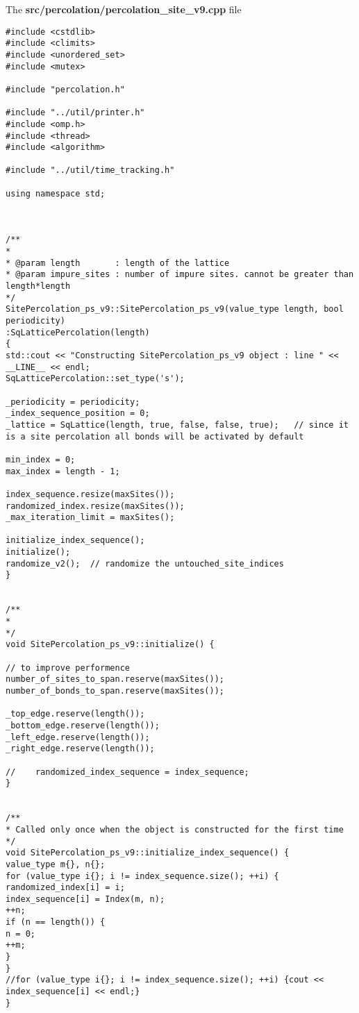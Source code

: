 
The \textbf{src/percolation/percolation\_site\_v9.cpp} file

\begin{lstlisting}[style=CStyle]
#include <cstdlib>
#include <climits>
#include <unordered_set>
#include <mutex>

#include "percolation.h"

#include "../util/printer.h"
#include <omp.h>
#include <thread>
#include <algorithm>

#include "../util/time_tracking.h"

using namespace std;



/**
*
* @param length       : length of the lattice
* @param impure_sites : number of impure sites. cannot be greater than length*length
*/
SitePercolation_ps_v9::SitePercolation_ps_v9(value_type length, bool periodicity)
:SqLatticePercolation(length)
{
std::cout << "Constructing SitePercolation_ps_v9 object : line " << __LINE__ << endl;
SqLatticePercolation::set_type('s');

_periodicity = periodicity;
_index_sequence_position = 0;
_lattice = SqLattice(length, true, false, false, true);   // since it is a site percolation all bonds will be activated by default

min_index = 0;
max_index = length - 1;

index_sequence.resize(maxSites());
randomized_index.resize(maxSites());
_max_iteration_limit = maxSites();

initialize_index_sequence();
initialize();
randomize_v2();  // randomize the untouched_site_indices
}


/**
*
*/
void SitePercolation_ps_v9::initialize() {

// to improve performence
number_of_sites_to_span.reserve(maxSites());
number_of_bonds_to_span.reserve(maxSites());

_top_edge.reserve(length());
_bottom_edge.reserve(length());
_left_edge.reserve(length());
_right_edge.reserve(length());

//    randomized_index_sequence = index_sequence;
}


/**
* Called only once when the object is constructed for the first time
*/
void SitePercolation_ps_v9::initialize_index_sequence() {
value_type m{}, n{};
for (value_type i{}; i != index_sequence.size(); ++i) {
randomized_index[i] = i;
index_sequence[i] = Index(m, n);
++n;
if (n == length()) {
n = 0;
++m;
}
}
//for (value_type i{}; i != index_sequence.size(); ++i) {cout << index_sequence[i] << endl;}
}



\end{lstlisting}
